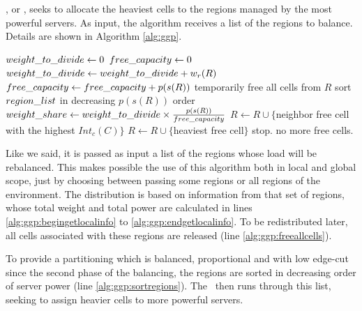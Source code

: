 \subsubsection{\ggp} %
\label{sec:alg:ggp}
	
\textbf{\ggp}, or \ggpmeaning, seeks to allocate the heaviest cells to the regions managed by the most powerful servers. As input, the algorithm receives a list of the regions to balance. Details are shown in Algorithm \ref{alg:ggp}.


\begin{algorithm}
\caption{\ggp}
\label{alg:ggp}
\begin{algorithmic}[1]
	 \STATE $weight\_to\_divide \leftarrow 0$ \label{alg:ggp:begingetlocalinfo}
	 \STATE $free\_capacity \leftarrow 0$
	 		\STATE $weight\_to\_divide \leftarrow weight\_to\_divide + w_r(R)$
	 		\STATE $free\_capacity \leftarrow free\_capacity + p(s(R))$
	 		\STATE temporarily free all cells from $R$ \label{alg:ggp:freeallcells}
	 \ENDFOR \label{alg:ggp:endgetlocalinfo}
	 \STATE sort $region\_list$ in decreasing $p(s(R))$ order \label{alg:ggp:sortregions}
	 		\STATE $weight\_share \leftarrow weight\_to\_divide \times \frac{p(s(R))}{free\_capacity}$ \label{alg:ggp:fraction}
	 		 \label{alg:ggp:whilefraction}
	 		   		\STATE $R \leftarrow R \cup \{$neighbor free cell with the highest $Int_c(C)$$\}$ \label{alg:ggp:freeneighbor}
	 		   		\STATE $R \leftarrow R \cup \{$heaviest free cell$\}$ \label{alg:ggp:freeheavycell}
	 		   \ELSE
	 		   		\STATE stop. no more free cells.
	 		   \ENDIF
	 		\ENDWHILE
	 \ENDFOR
\end{algorithmic}
\end{algorithm}

Like we said, it is passed as input a list of the regions whose load will be rebalanced. This makes possible the use of this algorithm both in local and global scope, just by choosing between passing some regions or all regions of the environment. The distribution is based on information from that set of regions, whose total weight and total power are calculated in lines \ref{alg:ggp:begingetlocalinfo} to \ref{alg:ggp:endgetlocalinfo}. To be redistributed later, all cells associated with these regions are released (line \ref{alg:ggp:freeallcells}).

To provide a partitioning which is balanced, proportional and with low edge-cut since the second phase of the balancing, the regions are sorted in decreasing order of server power (line \ref{alg:ggp:sortregions}). The \ggp\ then runs through this list, seeking to assign heavier cells to more powerful servers.%

